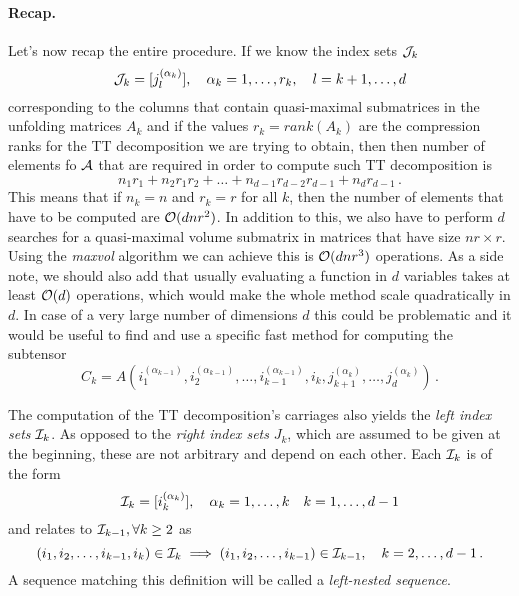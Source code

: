 \paragraph{Recap.}
Let's now recap the entire procedure. If we know the index sets $\mathcal{J}_k$
\begin{equation*}
  \mathcal{J}_k = [j_l^{(\alpha_k)}],\quad \alpha_k = 1,\ldots,r_k,\quad l = k+1,\ldots,d
\end{equation*}
corresponding to the columns that contain quasi-maximal submatrices in the unfolding matrices $A_k$ and if the values $r_k = rank(A_k)$ are the compression ranks for the TT decomposition we are trying to obtain, then then number of elements fo $\mathcal{A}$ that are required in order to compute such TT decomposition is
\begin{equation*}
  n_1 r_1 + n_2 r_1 r_2 + \ldots + n_{d-1} r_{d-2} r_{d-1} + n_d r_{d-1}\, .
\end{equation*}
This means that if $n_k = n$ and $r_k = r$ for all $k$, then the number of elements that have to be computed are $\mathcal{O}(dnr^2)$.
In addition to this, we also have to perform $d$ searches for a quasi-maximal volume submatrix in matrices that have size $nr \times r$. Using the \emph{maxvol} algorithm we can achieve this is $\mathcal{O}(dnr^3)$ operations.
As a side note, we should also add that usually evaluating a function in $d$ variables takes at least $\mathcal{O}(d)$ operations, which would make the whole method scale quadratically in $d$. In case of a very large number of dimensions $d$ this could be problematic and it would be useful to find and use a specific fast method for computing the subtensor
\begin{equation*}
  C_k = A(i_1^{(\alpha_{k-1})},i_2^{(\alpha_{k-1})},\ldots,i_{k-1}^{(\alpha_{k-1})},i_k,j_{k+1}^{(\alpha_k)},\ldots,j_d^{(\alpha_k)})\, .
\end{equation*}

The computation of the TT decomposition's carriages also yields the \emph{left index sets} $\mathcal{I}_k$. As opposed to the \emph{right index sets} $J_k$, which are assumed to be given at the beginning, these are not arbitrary and depend on each other. Each $\mathcal{I}_k$ is of the form
\begin{equation*}
  \mathcal{I}_k = [i_k^{(\alpha_k)}], \quad \alpha_k = 1,\ldots,k \quad k = 1,\ldots,d-1
\end{equation*}
and relates to $\mathcal{I}_{k-1}, \forall k \geq 2$ as
\begin{equation*}
  (i_1,i_2,\ldots,i_{k-1},i_k) \in \mathcal{I}_k \implies (i_1,i_2,\ldots,i_{k-1}) \in \mathcal{I}_{k-1}, \quad k=2,\ldots,d-1\, .
\end{equation*}
A sequence matching this definition will be called a \emph{left-nested sequence}.


